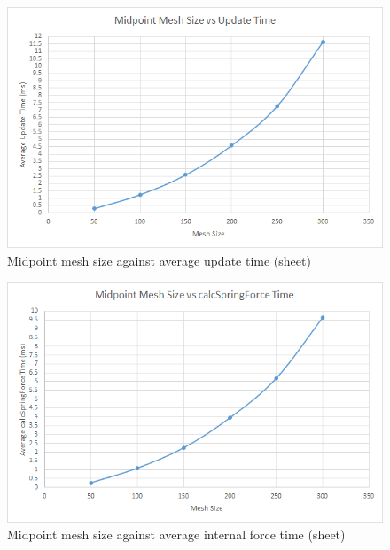     \begin{figure}
    \begin{center}
      \includegraphics[scale=.9]{Figures/sheet_m_m_ut}
    \end{center}
    \caption{Midpoint mesh size against average update time (sheet)}
    \label{fig:m mesh update sheet}
  \end{figure}
  
    \begin{figure}
    \begin{center}
      \includegraphics[scale=.9]{Figures/sheet_m_m_csf}
    \end{center}
    \caption{Midpoint mesh size against average internal force time (sheet)}
    \label{fig:m mesh csf sheet}
  \end{figure}
  
